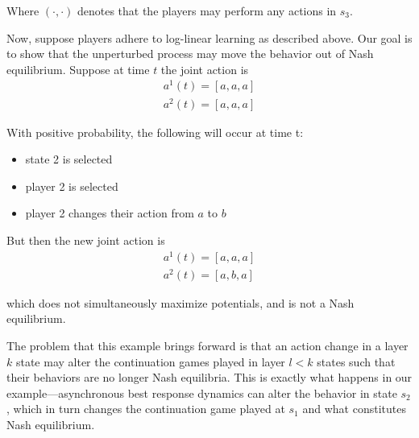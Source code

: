 \begin{eg}
Where $(\cdot, \cdot)$ denotes that the players may perform any actions in $s_3$. 

Now, suppose players adhere to log-linear learning as described above. Our goal is to show that the unperturbed process may move the behavior out of Nash equilibrium. Suppose at time $t$ the joint action is
\begin{align*}
a^1(t) = [a, a, a] \\
a^2(t) = [a, a, a]
\end{align*}

With positive probability, the following will occur at time t:
\begin{itemize}
\item state 2 is selected
\item player 2 is selected
\item player 2 changes their action from $a$ to $b$
\end{itemize}

But then the new joint action is
\begin{align*}
a^1(t) = [a, a, a] \\
a^2(t) = [a, b, a]
\end{align*}

which does not simultaneously maximize potentials, and is not a Nash equilibrium.

\end{eg}

The problem that this example brings forward is that an action change in a layer $k$ state may alter the continuation games played in layer $l < k$ states such that their behaviors are no longer Nash equilibria. This is exactly what happens in our example---asynchronous best response dynamics can alter the behavior in state $s_2$, which in turn changes the continuation game played at $s_1$ and what constitutes Nash equilibrium.